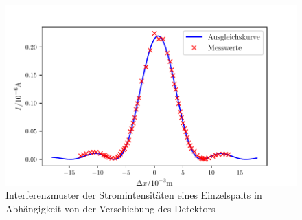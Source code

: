 \begin{figure}
\centering
\includegraphics[width=\linewidth-70pt,height=\textheight-70pt,keepaspectratio]{content/images/Einzelspalt.pdf}
\caption{Interferenzmuster der Stromintensitäten eines Einzelspalts in Abhängigkeit von der Verschiebung des Detektors}
\label{fig:Einzel}
\end{figure}


